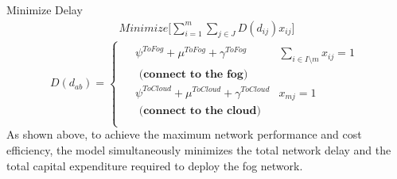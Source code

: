 \documentclass[10pt,journal,compsoc]{IEEEtran}
\begin{document}
Minimize Delay 
\begin{align}\label{obj2}
\textit{Minimize} \bigg[\sum_{i=1}^m\sum_{j\in J} D(d_{ij}) x_{ij}\bigg]
\end{align}
$$
D(d_{ab})  = %
	\begin{cases}
	\begin{aligned}
	&\psi^{ToFog} + \mu^{ToFog} + \gamma^{ToFog}&\sum_{i \in I  \setminus m}x_{ij} =1\\
	 &\textbf{ (connect to the fog)}\\
	&\psi^{ToCloud} + \mu^{ToCloud} + \gamma^{ToCloud}&x_{mj} = 1\\
	& \textbf{ (connect to the cloud)}\\
	\end{aligned}
	\end{cases}
$$
As shown above, to achieve the maximum network performance and cost efficiency, the model simultaneously minimizes the total network delay and the total capital expenditure required to deploy the fog network.  
\end{document}
